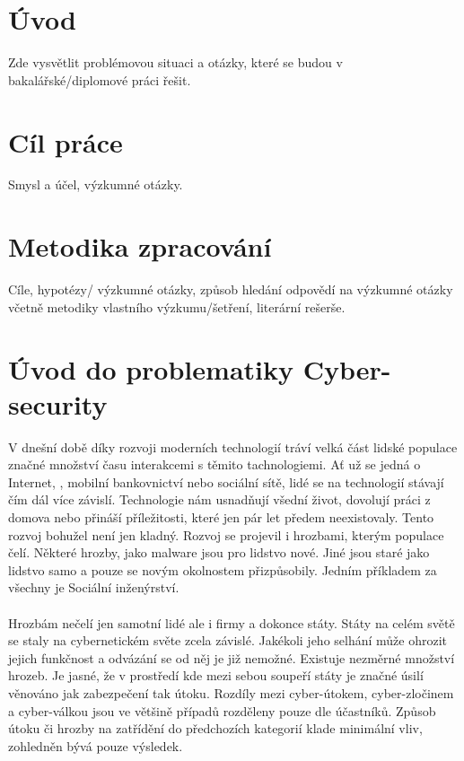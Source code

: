 \section{Úvod}


Zde vysvětlit problémovou situaci a otázky, které se budou v bakalářské/diplomové práci řešit.

\section{Cíl práce}


Smysl a účel, výzkumné otázky.

\section{Metodika zpracování}


Cíle, hypotézy/ výzkumné otázky, způsob hledání odpovědí na výzkumné otázky včetně metodiky vlastního výzkumu/šetření, literární rešerše.

\section{Úvod do problematiky Cyber-security}
V dnešní době díky rozvoji moderních technologií tráví velká část lidské populace značné množství času interakcemi s těmito tachnologiemi.
Ať už se jedná o Internet, , mobilní bankovnictví nebo sociální sítě, lidé se na technologií stávají čím dál více závislí.
Technologie nám usnadňují všední život, dovolují práci z domova nebo přináší příležitosti, které jen pár let předem neexistovaly.
Tento rozvoj bohužel není jen kladný.
Rozvoj se projevil i hrozbami, kterým populace čelí.
Některé hrozby, jako malware jsou pro lidstvo nové.
Jiné jsou staré jako lidstvo samo a pouze se novým okolnostem přizpůsobily.
Jedním příkladem za všechny je Sociální inženýrství.

\paragraph{}
Hrozbám nečelí jen samotní lidé ale i firmy a dokonce státy.
Státy na celém světě se staly na cybernetickém světe zcela závislé.\cite{LI20218176}
Jakékoli jeho selhání může ohrozit jejich funkčnost a odvázání se od něj je již nemožné.
Existuje nezměrné množství hrozeb.
Je jasné, že v prostředí kde mezi sebou soupeří státy je značné úsilí věnováno jak zabezpečení tak útoku.
Rozdíly mezi cyber-útokem, cyber-zločinem a cyber-válkou jsou ve většině případů rozděleny pouze dle účastníků.\cite{LI20218176}
Způsob útoku či hrozby na zatřídění do předchozích kategorií klade minimální vliv, zohledněn bývá pouze výsledek.


